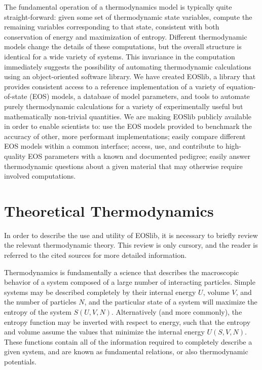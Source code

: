 \documentclass[twocolumn,10pt]{asme2ej}
\begin{document}
The fundamental operation of a thermodynamics model is typically quite straight-forward: given some set of thermodynamic state variables, compute the remaining variables corresponding to that state, consistent with both conservation of energy and maximization of entropy. Different thermodynamic models change the details of these computations, but the overall structure is identical for a wide variety of systems. This invariance in the computation immediately suggests the possibility of automating thermodynamic calculations using an object-oriented software library. We have created EOSlib, a library that provides consistent access to a reference implementation of a variety of equation-of-state (EOS) models, a database of model parameters, and tools to automate purely thermodynamic calculations for a variety of experimentally useful but mathematically non-trivial quantities. We are making EOSlib publicly available in order to enable scientists to: use the EOS models provided to benchmark the accuracy of other, more performant implementations; easily compare different EOS models within a common interface; access, use, and contribute to high-quality EOS parameters with a known and documented pedigree; easily answer thermodynamic questions about a given material that may otherwise require involved computations.

\section{Theoretical Thermodynamics}
In order to describe the use and utility of EOSlib, it is necessary to briefly review the relevant thermodynamic theory. This review is only cursory, and the reader is referred to the cited sources for more detailed information.

Thermodynamics is fundamentally a science that describes the macroscopic behavior of a system composed of a large number of interacting particles.\cite{RN1010} Simple systems may be described completely by their internal energy $U$, volume $V$, and the number of particles $N$, and the particular state of a system will maximize the entropy of the system $S\left(U,V,N\right)$. Alternatively (and more commonly), the entropy function may be inverted with respect to energy, such that the entropy and volume assume the values that minimize the internal energy $U\left(S,V,N\right)$. These functions contain all of the information required to completely describe a given system, and are known as fundamental relations, or also thermodynamic potentials. 
\end{document}
